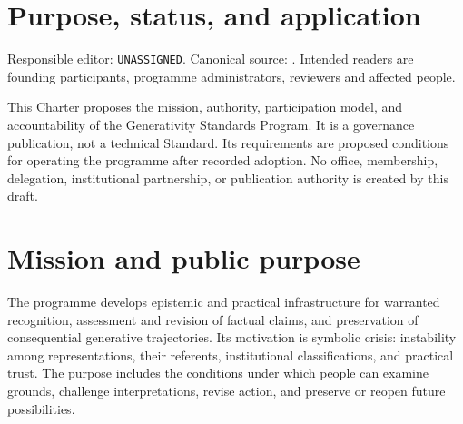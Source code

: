 \documentclass[11pt,a4paper]{article}
\begin{document}
\tableofcontents
\clearpage

\section{Purpose, status, and application}
Responsible editor: \texttt{UNASSIGNED}. Canonical source: . Intended readers are founding participants, programme administrators, reviewers and affected people.

This Charter proposes the mission, authority, participation model, and accountability of the Generativity Standards Program. It is a governance publication, not a technical Standard. Its requirements are proposed conditions for operating the programme after recorded adoption. No office, membership, delegation, institutional partnership, or publication authority is created by this draft.




\section{Mission and public purpose}
The programme develops epistemic and practical infrastructure for warranted recognition, assessment and revision of factual claims, and preservation of consequential generative trajectories. Its motivation is symbolic crisis: instability among representations, their referents, institutional classifications, and practical trust. The purpose includes the conditions under which people can examine grounds, challenge interpretations, revise action, and preserve or reopen future possibilities.
\end{document}
